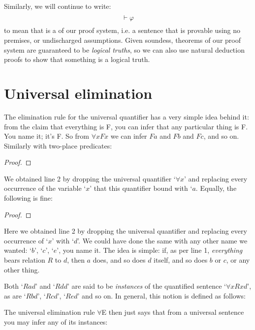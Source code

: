 Similarly, we will continue to write:
$${} \vdash \mathcal{\varphi}$$
to mean that \meta{\varphi} is a  of our proof system, i.e. a sentence that is provable using no premises, or undischarged assumptions.  Given soundess, theorems of our proof system are guaranteed to be \emph{logical truths}, so we can also use natural deduction proofs to show that something is a logical truth.



\section{Universal elimination}\label{s:UniversalElim}


The elimination rule for the universal quantifier has a very simple idea behind it: from the claim that everything is F, you can infer that any particular thing is F. You name it; it's F.  So from $\forall xFx$ we can infer $Fa$ and $Fb$ and $Fc$, and so on.  Similarly with two-place predicates:
\begin{proof}
	 
\end{proof}
We obtained line 2 by dropping the universal quantifier `$\forall x$' and replacing every occurrence of the variable `$x$' that this quantifier bound with `$a$. Equally, the following is fine:
\begin{proof}
	 
\end{proof}
Here we obtained line 2 by dropping the universal quantifier and replacing every occurrence of `$x$' with `$d$'. We could have done the same with any other name we wanted: `$b$', `$c$', `$e$', you name it.  The idea is simple: if, as per line 1, \emph{everything} bears relation $R$ to $d$, then $a$ does, and so does $d$ itself, and so does $b$ or $c$, or any other thing.

Both `$Rad$' and `$Rdd$' are said to be \emph{instances} of the quantified sentence `$\forall xRxd$', as are `$Rbd$', `$Rcd$', `$Red$' and so on.  In general, this notion is defined as follows:

The universal elimination rule $\forall$E then just says that from a universal sentence you may infer any of its instances:

